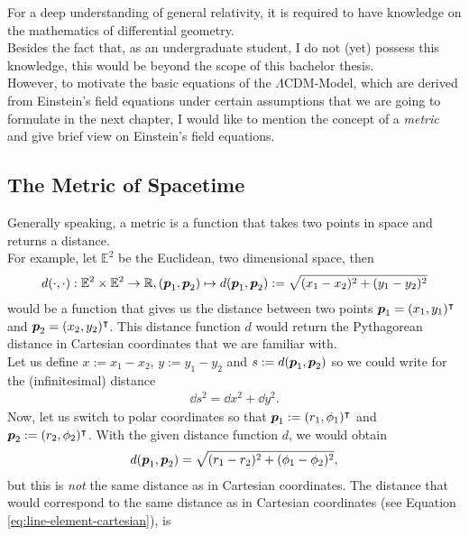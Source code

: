 \noindent For a deep understanding of general relativity, it is required to have knowledge on the mathematics of differential geometry. \\
\noindent Besides the fact that, as an undergraduate student, I do not (yet) possess this knowledge, this would be beyond the scope of this bachelor thesis. \\
\noindent However, to motivate the basic equations of the $\Lambda$CDM-Model, which are derived from Einstein's field equations under certain assumptions that we are going to formulate in the next chapter, I would like to mention the concept of a \textit{metric} and give brief view on Einstein's field equations.

\subsection{The Metric of Spacetime}
Generally speaking, a metric is a function that takes two points in space and returns a distance. \\
For example, let $\mathbb{E}^2$ be the Euclidean, two dimensional space, then
\begin{align}
    d(\cdot, \cdot) : \mathbb{E}^{2} \times \mathbb{E}^{2} \to \mathbb{R}, (\vb*{p}_{1}, \vb*{p}_{2}) \mapsto d(\vb*{p}_{1}, \vb*{p}_{2}) := \sqrt{(x_{1} - x_{2})^2 + (y_{1} - y_{2})^2} 
\end{align}
would be a function that gives us the distance between two points $\vb*{p}_{1} = (x_{1}, y_{1})^{\intercal}$ and $\vb*{p}_{2} = (x_{2}, y_{2})^{\intercal}$. This distance function $d$ would return the Pythagorean distance in Cartesian coordinates that we are familiar with. \\
Let us define $x := x_{1} - x_{2}$, $y := y_{1} - y_{2}$ and $s := d(\vb*{p}_{1}, \vb*{p}_{2})$ so we could write for the (infinitesimal) distance 
\begin{align}
    \dd{s}^2 = \dd{x}^2 + \dd{y}^2. \label{eq:line-element-cartesian}
\end{align}
Now, let us switch to polar coordinates so that $\vb*{p}_{1} := (r_{1}, \phi_{1})^{\intercal}$ and $\vb*{p}_{2} := (r_{2}, \phi_{2})^{\intercal}$. With the given distance function $d$, we would obtain 
\begin{align}
    d(\vb*{p}_{1}, \vb*{p}_{2}) = \sqrt{(r_{1} - r_{2})^2 + (\phi_{1} - \phi_{2})^2}, 
\end{align}
but this is \textit{not} the same distance as in Cartesian coordinates. The distance that would correspond to the same distance as in Cartesian coordinates (see Equation \eqref{eq:line-element-cartesian}), is
